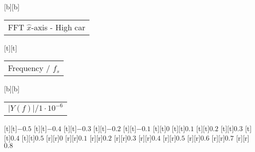 %
%
[b][b]{\fontsize{8}{12}\selectfont \setlength{\tabcolsep}{0pt}\begin{tabular}{c}FFT $\hat{x}$-axis - High car\end{tabular}}%
[t][t]{\fontsize{8}{12}\selectfont \setlength{\tabcolsep}{0pt}\begin{tabular}{c}Frequency / $f_s$\end{tabular}}%
[b][b]{\fontsize{8}{12}\selectfont \setlength{\tabcolsep}{0pt}\begin{tabular}{c}$\vert{}Y(f)\vert{}/1\cdot{}10^{-6}$\end{tabular}}%
%
\fontsize{6}{8}%
\selectfont%
%
[t][t]{$-0.5$}%
[t][t]{$-0.4$}%
[t][t]{$-0.3$}%
[t][t]{$-0.2$}%
[t][t]{$-0.1$}%
[t][t]{$0$}%
[t][t]{$0.1$}%
[t][t]{$0.2$}%
[t][t]{$0.3$}%
[t][t]{$0.4$}%
[t][t]{$0.5$}%
%
[r][r]{$0$}%
[r][r]{$0.1$}%
[r][r]{$0.2$}%
[r][r]{$0.3$}%
[r][r]{$0.4$}%
[r][r]{$0.5$}%
[r][r]{$0.6$}%
[r][r]{$0.7$}%
[r][r]{$0.8$}%
%
%
